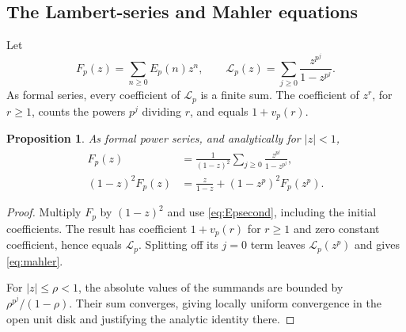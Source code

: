 \documentclass[11pt,a4paper]{article}
\numberwithin{equation}{section}
\newtheorem{proposition}[theorem]{Proposition}
\theoremstyle{definition}
\theoremstyle{remark}
\begin{document}
\subsection{The Lambert-series and Mahler equations}
Let
\[
 F_p(z)=\sum_{n\geq0}E_p(n)z^n,\qquad
 \mathcal L_p(z)=\sum_{j\geq0}\frac{z^{p^j}}{1-z^{p^j}}.
\]
As formal series, every coefficient of $\mathcal L_p$ is a finite sum. The coefficient of $z^r$, for $r\geq1$, counts the powers $p^j$ dividing $r$, and equals $1+v_p(r)$.

\begin{proposition}\label{prop:gf}
As formal power series, and analytically for $|z|<1$,
\begin{align}
 F_p(z)&=\frac1{(1-z)^2}\sum_{j\geq0}\frac{z^{p^j}}{1-z^{p^j}},\label{eq:gf}\\
 (1-z)^2F_p(z)&=\frac{z}{1-z}+(1-z^p)^2F_p(z^p).\label{eq:mahler}
\end{align}
\end{proposition}
\begin{proof}
Multiply $F_p$ by $(1-z)^2$ and use \eqref{eq:Epsecond}, including the initial coefficients. The result has coefficient $1+v_p(r)$ for $r\geq1$ and zero constant coefficient, hence equals $\mathcal L_p$. Splitting off its $j=0$ term leaves $\mathcal L_p(z^p)$ and gives \eqref{eq:mahler}.

For $|z|\leq\rho<1$, the absolute values of the summands are bounded by $\rho^{p^j}/(1-\rho)$. Their sum converges, giving locally uniform convergence in the open unit disk and justifying the analytic identity there.
\end{proof}
\end{document}
